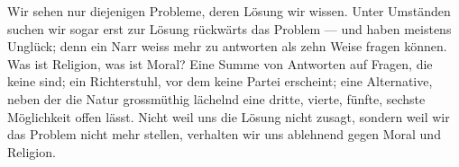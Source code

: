 Wir sehen nur diejenigen Probleme, deren Lösung wir wissen. Unter Umständen suchen wir sogar erst zur Lösung rückwärts das Problem — und haben meistens Unglück; denn ein Narr weiss mehr zu antworten als zehn Weise fragen können. Was ist Religion, was ist Moral? Eine Summe von Antworten auf Fragen, die keine sind; ein Richterstuhl, vor dem keine Partei erscheint; eine Alternative, neben der die Natur grossmüthig lächelnd eine dritte, vierte, fünfte, sechste Möglichkeit offen lässt. Nicht weil uns die Lösung nicht zusagt, sondern weil wir das Problem nicht mehr stellen, verhalten wir uns ablehnend gegen Moral und Religion.
\par

